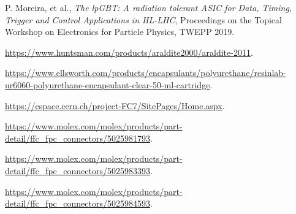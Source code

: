 \documentclass[a4paper,11pt]{article}
\begin{document}
\begin{thebibliography}{99}
P. Moreira, et al., \emph{The lpGBT: A radiation tolerant ASIC for Data, Timing, Trigger and Control Applications in HL-LHC},
Proceedings on the Topical Workshop on Electronics for Particle Physics, TWEPP 2019.


\url{https://www.huntsman.com/products/araldite2000/araldite-2011}.


\url{https://www.ellsworth.com/products/encapsulants/polyurethane/resinlab-ur6060-polyurethane-encapsulant-clear-50-ml-cartridge}.

\url{https://espace.cern.ch/project-FC7/SitePages/Home.aspx}.

%
%
%
%

\url{https://www.molex.com/molex/products/part-detail/ffc_fpc_connectors/5025981793}.

\url{https://www.molex.com/molex/products/part-detail/ffc_fpc_connectors/5025983393}.

\url{https://www.molex.com/molex/products/part-detail/ffc_fpc_connectors/5025984593}.

\end{thebibliography}
\end{document}
